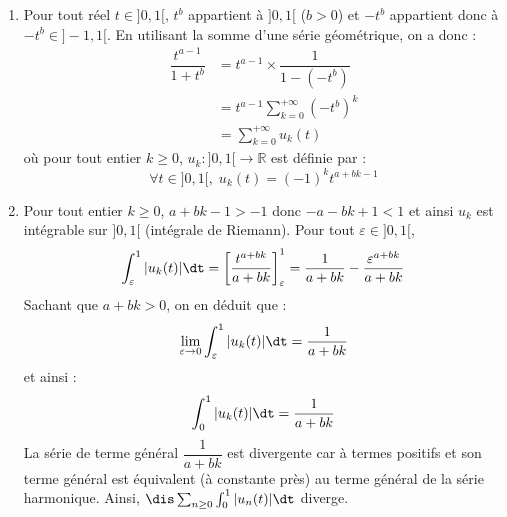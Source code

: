 \documentclass[a4paper,10pt]{report}
\begin{document}
\begin{enumerate}
\item Pour tout réel $t \in ]0,1[$, $t^b$ appartient à $]0,1[$ ($b>0$) et $-t^b$ appartient donc à $-t^b \in ]-1,1[$. En utilisant la somme d'une série géométrique, on a donc :
\begin{align*}
\dfrac{t^{a-1}}{1+t^b} & = t^{a-1} \times \dfrac{1}{1-(-t^b)} \\
& = t^{a-1} \sum_{k=0}^{+ \infty} (-t^b)^k \\
& = \sum_{k=0}^{+ \infty} u_k(t)
\end{align*}
où pour tout entier $k \geq 0$, $u_k : ]0,1[ \rightarrow \mathbb{R}$ est définie par :
$$ \forall t \in ]0,1[, \; u_k(t) = (-1)^k t^{a+bk-1}$$
\item Pour tout entier $k \geq 0$, $a+bk-1>-1$ donc $-a-bk+1<1$ et ainsi $u_k$ est intégrable sur $]0,1[$ (intégrale de Riemann). Pour tout $\varepsilon \in ]0,1[$,
$$ \int_{\varepsilon}^1 \vert u_k(t) \vert \dt = \left[ \dfrac{t^{a+bk}}{a+bk} \right]_{\varepsilon}^1 =\dfrac{1}{a+bk} - \dfrac{\varepsilon^{a+bk}}{a+bk}$$
Sachant que $a+bk>0$, on en déduit que :
$$ \lim_{\varepsilon \rightarrow 0}  \int_{\varepsilon}^1 \vert u_k(t) \vert \dt  = \dfrac{1}{a+bk}$$
et ainsi :
$$ \int_0^1 \vert u_k(t) \vert \dt = \dfrac{1}{a+bk}$$
La série de terme général $ \dfrac{1}{a+bk}$ est divergente car à termes positifs et son terme général est équivalent (à constante près) au terme général de la série harmonique. Ainsi, $\dis \sum_{n \geq 0} \int_0^1 \vert u_n(t) \vert \dt$ diverge.

\medskip


\end{enumerate}
\end{document}
